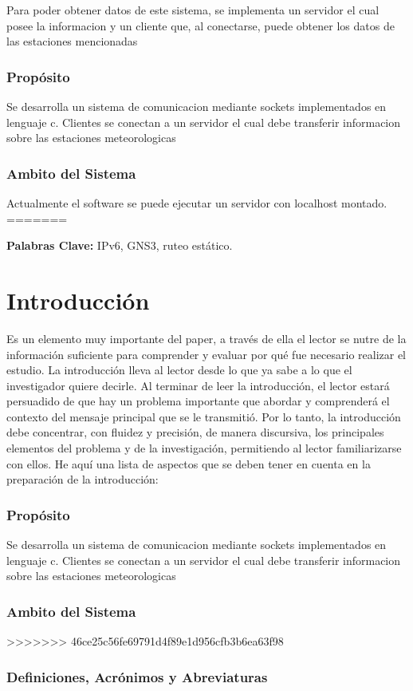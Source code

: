 \documentclass[10pt, a4paper,notitlepage]{article}
\begin{document}
{Para poder obtener datos de este sistema, se implementa un servidor el cual posee la informacion y un cliente que, al conectarse, puede obtener los datos de las estaciones mencionadas
\subsubsection{Propósito}
Se desarrolla un sistema de comunicacion mediante sockets implementados en lenguaje c. Clientes se conectan a un servidor el cual debe transferir informacion sobre las estaciones meteorologicas
\subsubsection{Ambito del Sistema}
Actualmente el software se puede ejecutar un servidor con localhost montado.
=======

\textbf{Palabras Clave:} IPv6, GNS3, ruteo estático.\\

\section{Introducción}
Es un elemento muy importante del paper, a través de ella el lector se nutre de la información 
suficiente para  comprender y evaluar por qué fue necesario realizar el estudio.
La introducción lleva al lector desde lo que ya sabe a lo que el investigador quiere decirle. Al
terminar de leer la introducción, el lector estará persuadido de que hay un problema
importante que abordar y comprenderá el contexto del mensaje principal que se le transmitió.
Por lo tanto, la introducción debe concentrar, con fluidez y precisión, de manera discursiva, los
principales elementos del problema y de la investigación, permitiendo al lector familiarizarse
con ellos.
He aquí una lista de aspectos que se deben tener en cuenta en la preparación de la introducción:
\subsubsection{Propósito}
Se desarrolla un sistema de comunicacion mediante sockets implementados en lenguaje c. Clientes se conectan a un servidor el cual debe transferir informacion sobre las estaciones meteorologicas
\subsubsection{Ambito del Sistema}
>>>>>>> 46ce25c56fe69791d4f89e1d956cfb3b6ea63f98
\subsubsection{Definiciones, Acrónimos y Abreviaturas} 
}
\end{document}
